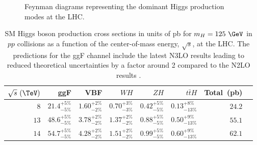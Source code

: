 \begin{figure}[!htbp]
{{}}

\caption{Feynman diagrams representing the dominant Higgs production modes at
the LHC.}

\label{fig:higgs_production}
\end{figure}

\begin{table}[htpb]
 \centering
 \caption{ SM Higgs boson production cross sections in units of pb for $m_{H}=125~\GeV$ in $pp$ collisions as a function of the center-of-mass energy, $\sqrt{s}$, at the LHC.
  The predictions for the ggF channel include the latest N3LO results leading to reduced theoretical uncertainties by a factor around 2 compared to the N2LO results \cite{PDG2018:Ch11}.}
 \begin{tabular}{@{}rrrrrrrr@{}} \toprule
  $\sqrt{s}~(\TeV)$ & ggF                  & VBF                  & $WH$                 & $ZH$                 & $t\bar{t}H$            & Total~(pb) \\ \midrule
  $8$               & $21.4_{-5\%}^{+5\%}$ & $1.60_{-2\%}^{+2\%}$ & $0.70_{-3\%}^{+3\%}$ & $0.42_{-5\%}^{+5\%}$ & $0.13_{-13\%}^{+8\%}$ &  $24.2$    \\
  \addlinespace[0.3em]
  $13$              & $48.6_{-5\%}^{+5\%}$ & $3.78_{-2\%}^{+2\%}$ & $1.37_{-2\%}^{+2\%}$ & $0.88_{-5\%}^{+5\%}$ & $0.50_{-13\%}^{+9\%}$ &  $55.1$    \\
  \addlinespace[0.3em]
  $14$              & $54.7_{-5\%}^{+5\%}$ & $4.28_{-2\%}^{+2\%}$ & $1.51_{-2\%}^{+2\%}$ & $0.99_{-5\%}^{+5\%}$ & $0.60_{-13\%}^{+9\%}$ &  $62.1$    \\
  \bottomrule
 \end{tabular}\label{table:higgs_production_xsection}
\end{table}

